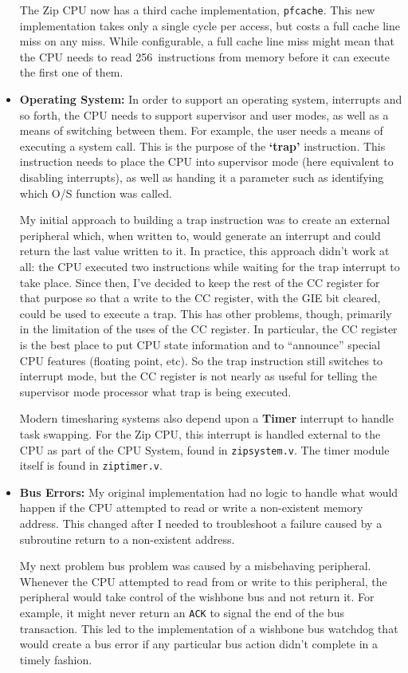 \documentclass{gqtekspec}
\begin{document}
\begin{itemize}
	The Zip CPU now has a third cache implementation, {\tt pfcache}.  This
	new implementation takes only a single cycle per access, but costs a
	full cache line miss on any miss.  While configurable, a full cache
	line miss might mean that the CPU needs to read 256~instructions from
	memory before it can execute the first one of them.

\item {\bf Operating System:} In order to support an operating system,
	interrupts and so forth, the CPU needs to support supervisor and
	user modes, as well as a means of switching between them.  For example,
	the user needs a means of executing a system call.  This is the 
	purpose of the {\bf `trap'} instruction.  This instruction needs to
	place the CPU into supervisor mode (here equivalent to disabling
	interrupts), as well as handing it a parameter such as identifying
	which O/S function was called. 

My initial approach to building a trap instruction was to create an external
peripheral which, when written to, would generate an interrupt and could
return the last value written to it.  In practice, this approach didn't work
at all: the CPU executed two instructions while waiting for the
trap interrupt to take place.  Since then, I've decided to keep the rest of
the CC register for that purpose so that a write to the CC register, with the
GIE bit cleared, could be used to execute a trap.  This has other problems,
though, primarily in the limitation of the uses of the CC register.  In 
particular, the CC register is the best place to put CPU state information and
to ``announce'' special CPU features (floating point, etc).  So the trap
instruction still switches to interrupt mode, but the CC register is not
nearly as useful for telling the supervisor mode processor what trap is being
executed.

Modern timesharing systems also depend upon a {\bf Timer} interrupt
to handle task swapping.  For the Zip CPU, this interrupt is handled
external to the CPU as part of the CPU System, found in {\tt zipsystem.v}. 
The timer module itself is found in {\tt ziptimer.v}.

\item {\bf Bus Errors:} My original implementation had no logic to handle
	what would happen if the CPU attempted to read or write a non-existent
	memory address.  This changed after I needed to troubleshoot a failure
	caused by a subroutine return to a non-existent address.

	My next problem bus problem was caused by a misbehaving peripheral.
	Whenever the CPU attempted to read from or write to this peripheral,
	the peripheral would take control of the wishbone bus and not return
	it.  For example, it might never return an {\tt ACK} to signal
	the end of the bus transaction.  This led to the implementation of
	a wishbone bus watchdog that would create a bus error if any particular
	bus action didn't complete in a timely fashion.


\end{itemize}
\end{document}
